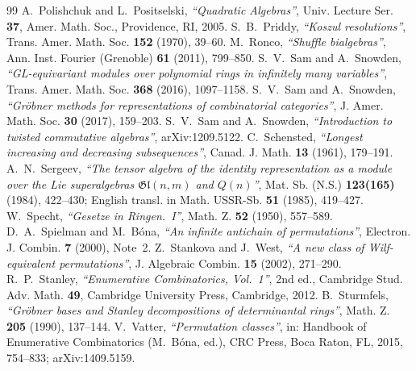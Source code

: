 \documentclass[11pt]{amsart}
\theoremstyle{definition}
\theoremstyle{remark}
\begin{document}
\begin{thebibliography}{99}
 A.~Polishchuk and L.~Positselski, \textit{``Quadratic Algebras''}, Univ. Lecture Ser. \textbf{37}, Amer. Math. Soc., Providence, RI, 2005.
 S.~B.~Priddy, \textit{``Koszul resolutions''}, Trans. Amer. Math. Soc. \textbf{152} (1970), 39--60.
 M.~Ronco, \textit{``Shuffle bialgebras''}, Ann. Inst. Fourier (Grenoble) \textbf{61} (2011), 799--850.
 S.~V.~Sam and A.~Snowden, \textit{``GL-equivariant modules over polynomial rings in infinitely many variables''}, Trans. Amer. Math. Soc. \textbf{368} (2016), 1097--1158.
 S.~V.~Sam and A.~Snowden, \textit{``Gr\"obner methods for representations of combinatorial categories''}, J. Amer. Math. Soc. \textbf{30} (2017), 159--203.
 S.~V.~Sam and A.~Snowden, \textit{``Introduction to twisted commutative algebras''}, arXiv:1209.5122.
 C.~Schensted, \textit{``Longest increasing and decreasing subsequences''}, Canad. J. Math. \textbf{13} (1961), 179--191.
 A.~N.~Sergeev, \textit{``The tensor algebra of the identity representation as a module over the Lie superalgebras $\mathfrak{Gl}(n,m)$ and $Q(n)$''}, Mat. Sb. (N.S.) \textbf{123(165)} (1984), 422--430; English transl. in Math. USSR-Sb. \textbf{51} (1985), 419--427.
 W.~Specht, \textit{``Gesetze in Ringen.~I''}, Math. Z. \textbf{52} (1950), 557--589.
 D.~A.~Spielman and M.~B\'ona, \textit{``An infinite antichain of permutations''}, Electron. J. Combin. \textbf{7} (2000), Note~2.
 Z.~Stankova and J.~West, \textit{``A new class of Wilf-equivalent permutations''}, J. Algebraic Combin. \textbf{15} (2002), 271--290.
 R.~P.~Stanley, \textit{``Enumerative Combinatorics, Vol.~1''}, 2nd ed., Cambridge Stud. Adv. Math. \textbf{49}, Cambridge University Press, Cambridge, 2012.
 B.~Sturmfels, \textit{``Gr\"obner bases and Stanley decompositions of determinantal rings''}, Math. Z. \textbf{205} (1990), 137--144.
 V.~Vatter, \textit{``Permutation classes''}, in: Handbook of Enumerative Combinatorics (M.~B\'ona, ed.), CRC Press, Boca Raton, FL, 2015, 754--833; arXiv:1409.5159.
\end{thebibliography}
\end{document}
